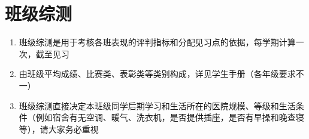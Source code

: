 \section[班级综测]{班级综测}
\label{class_evaluation}
\begin{enumerate}
      \item 班级综测是用于考核各班表现的评判指标和分配见习点的依据\footnotemark，每学期计算一次，截至见习
      \item 由班级平均成绩、比赛类、表彰类等类别构成，详见学生手册（各年级要求不一）
      \item 班级综测直接决定本班级同学后期学习和生活所在的医院规模、等级和生活条件（例如宿舍有无空调、暖气、洗衣机，是否提供插座，是否有早操和晚查寝\footnotemark 等），请大家务必重视
\end{enumerate}